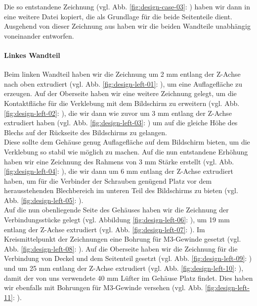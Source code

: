 \noindent Die so entstandene Zeichnung (vgl. Abb. \ref{fig:design-case-03}: ) haben wir dann in eine weitere Datei kopiert, die als Grundlage für die beide Seitenteile dient. 
Ausgehend von dieser Zeichnung aus haben wir die beiden Wandteile unabhängig voneinander entworfen.\par
\paragraph{Linkes Wandteil}
Beim linken Wandteil haben wir die Zeichnung um 2 mm entlang der Z-Achse nach oben extrudiert (vgl. Abb. \ref{fig:design-left-01}: ), um eine Auflagefläche zu erzeugen. 
Auf der Oberseite haben wir eine weitere Zeichnung gelegt, um die Kontaktfläche für die Verklebung mit dem Bildschirm zu erweitern (vgl. Abb. \ref{fig:design-left-02}: ), die wir dann wie zuvor um 3 mm entlang der Z-Achse extrudiert haben (vgl. Abb. \ref{fig:design-left-03}: ) um auf die gleiche Höhe des Blechs auf der Rückseite des Bildschirms zu gelangen. \\
\noindent Diese sollte dem Gehäuse genug Auflagefläche auf dem Bildschirm bieten, um die Verklebung so stabil wie möglich zu machen. 
Auf die nun entstandene Erhöhung haben wir eine Zeichnung des Rahmens von 3 mm Stärke erstellt (vgl. Abb. \ref{fig:design-left-04}: ), die wir dann um 6 mm entlang der Z-Achse extrudiert haben, um für die Verbinder der Schrauben genügend Platz vor dem herausstehenden Blechbereich im unteren Teil des Bildschirms zu bieten (vgl. Abb.  \ref{fig:design-left-05}: ). \\
\noindent Auf die nun obenliegende Seite des Gehäuses haben wir die Zeichnung der Verbindungsstücke gelegt (vgl. Abbildung \ref{fig:design-left-06}: ), um 19 mm entlang der Z-Achse extrudiert (vgl. Abb. \ref{fig:design-left-07}: ). 
Im Kreismittelpunkt der Zeichnungen eine Bohrung für M3-Gewinde gesetzt (vgl. Abb. \ref{fig:design-left-08}: ). 
Auf die Oberseite haben wir die Zeichnung für die Verbindung von Deckel und dem Seitenteil gesetzt (vgl. Abb. \ref{fig:design-left-09}: ) und um 25 mm entlang der Z-Achse extrudiert (vgl. Abb. \ref{fig:design-left-10}: ), damit der von uns verwendete 40 mm Lüfter im Gehäuse Platz findet.
Dies haben wir ebenfalls mit Bohrungen für M3-Gewinde versehen (vgl. Abb. \ref{fig:design-left-11}: ).\par
